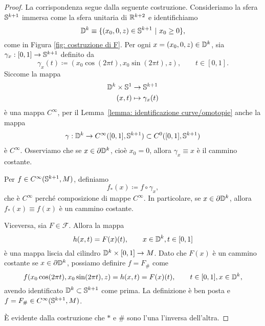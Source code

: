 \begin{proof}
	La corrispondenza segue dalla seguente costruzione. Consideriamo la sfera \(\mathbb{S}^{k+1}\) immersa come la sfera unitaria di \(\mathbb{R}^{k+2}\) e identifichiamo
	\[
	\mathbb{D}^k \equiv \{(x_0,0,z) \in \mathbb{S}^{k+1} \ | \ x_0 \geq 0\},
	\]
	come in Figura \ref{fig: costruzione di F}. Per ogni \(x=(x_0,0,z) \in \mathbb{D}^k\), sia \(\gamma_x:[0,1]\to \mathbb{S}^{k+1}\) definito da
	\[
	\gamma_x(t) \coloneq (x_0 \cos(2\pi t),x_0 \sin(2\pi t),z), \qquad t \in [0,1].
	\]
	Siccome la mappa 
	\begin{align*}
		\mathbb{D}^k \times \mathbb{S}^1 &\to \mathbb{S}^{k+1} \\
		(x,t) &\mapsto \gamma_x(t)
	\end{align*}
	è una mappa \(C^\infty\), per il Lemma~\ref{lemma: identificazione curve/omotopie} anche la mappa
	\begin{align*}
		\gamma: \mathbb{D}^k \to C^\infty([0,1],\mathbb{S}^{k+1}) \subset C^0([0,1],\mathbb{S}^{k+1})
	\end{align*}
	è \(C^\infty\). Osserviamo che se \(x \in \partial \mathbb{D}^k\), cioè \(x_0=0\), allora \(\gamma_x \equiv x\) è il cammino costante.
	
	Per \(f \in C^\infty(\mathbb{S}^{k+1},M) \), definiamo
	\[
		f_*(x) \coloneq f \circ \gamma_x,
	\]
	che è \(C^\infty\) perché composizione di mappe \(C^\infty\). In particolare, se \(x \in \partial \mathbb{D}^k\), allora \(f_*(x) \equiv f(x)\) è un cammino costante. 
	
	
	
	Viceversa, sia \(F \in \mathcal{F}\). Allora la mappa 
	\[
	h(x,t) = F(x)(t), \qquad x\in \mathbb{D}^k, t \in [0,1]
	\]
	è una mappa liscia dal cilindro \(\mathbb{D}^k \times [0,1] \to M\). Dato che \(F(x)\) è un cammino costante se \(x \in \partial \mathbb{D}^k\), possiamo definire \(f=F_\#\) come
	\[
	f(x_0 \cos (2\pi t), x_0 \sin (2 \pi t), z) = h(x,t) = F(x)(t), \qquad t \in [0,1], x \in \mathbb{D}^k,
	\]
	avendo identificato \(\mathbb{D}^k \subset \mathbb{S}^{k+1}\) come prima. La definizione è ben posta e \(f = F_\# \in C^\infty(\mathbb{S}^{k+1},M)\). 
	
	È evidente dalla costruzione che \(*\) e \(\#\) sono l'una l'inversa dell'altra.
\end{proof}

